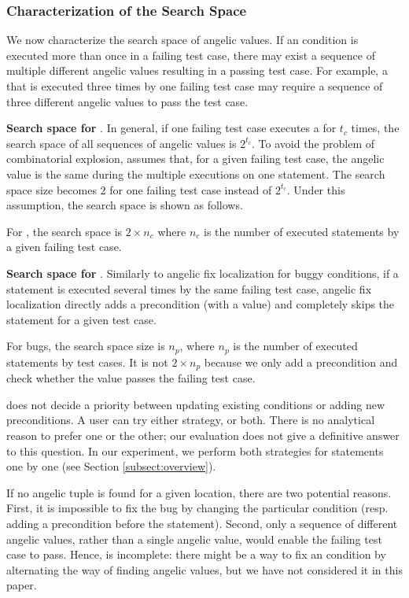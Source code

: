 \subsubsection{Characterization of the Search Space}
\label{subsubsect:search-space}
We now characterize the search space of angelic values. 
If an \ourif condition is executed more than once in a failing test case, there may exist a sequence of multiple different angelic values resulting in a passing test case. For example, a \buggycondition that is executed three times by one failing test case may require a sequence of three different angelic values to pass the test case. 

\textbf{Search space for \buggyconditions}. 
In general, if one failing test case executes a \buggycondition for $t_c$ times, the search space of all sequences of angelic values is $2^{t_c}$.
To avoid the problem of combinatorial explosion, \nopol assumes that, for a given failing test case, the angelic value is the same during the multiple executions on one statement. 
The search space size becomes $2$ for one failing test case instead of $2^{t_c}$. Under this assumption, the search space is shown as follows. 

For \buggycondition, the search space is $2\times n_c$ where $n_c$ is the number of executed \ourif statements by a given failing test case.

\textbf{Search space for \preconditions}.
Similarly to angelic fix localization for buggy \ourif conditions, if a statement is executed several times by the same failing test case, angelic fix localization directly adds a precondition (with a  value) and completely skips the statement for a given test case. 

For \precondition bugs, the search space size is $n_p$, where $n_p$ is the number of executed statements by test cases. It is not $2\times n_p$ because we only add a precondition and check whether the  value passes the failing test case.

\nopol does not decide a priority between updating existing conditions or adding new preconditions. A user can try either strategy, or both. There is no analytical reason to prefer one or the other; our evaluation does not give a definitive answer to this question. In our experiment, we perform both strategies for statements one by one (see Section \ref{subsect:overview}). 

If no angelic tuple is found for a given location, there are two potential reasons. 
First, it is impossible to fix the bug by changing the particular condition (resp. adding a precondition before the statement).
Second, only a sequence of different angelic values, rather than a single angelic value, would enable the failing test case to pass.
Hence, \nopol is incomplete: there might be a way to fix an \ourif condition by alternating the way of finding angelic values, but we have not considered it in this paper.

